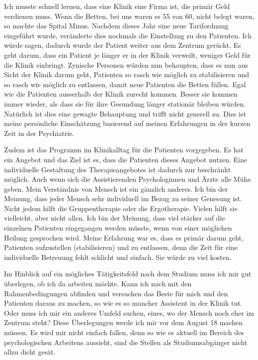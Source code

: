 Ich musste schnell lernen, dass eine Klinik eine Firma ist, die primär Geld verdienen muss. Wenn die Betten, bei uns waren es 55 von 60, nicht belegt waren, so machte das Spital Minus. Nachdem dieses Jahr eine neue Tarifordnung eingeführt wurde, veränderte dies nochmals die Einstellung zu den Patienten. Ich würde sagen, dadurch wurde der Patient weiter aus dem Zentrum gerückt. Es geht darum, dass ein Patient je länger er in der Klinik verweilt, weniger Geld für die Klinik einbringt. Zynische Personen würden nun behaupten, dass es nun aus Sicht der Klinik darum geht, Patienten so rasch wie möglich zu stabilisieren und so rasch wie möglich zu entlassen, damit neue Patienten die Betten füllen. Egal wie die Patienten ausserhalb der Klinik zurecht kommen. Besser sie kommen immer wieder, als dass sie für ihre Gesundung länger stationär bleiben würden. Natürlich ist dies eine gewagte Behauptung und trifft nicht generell zu. Dies ist meine persönliche Einschätzung basierend auf meinen Erfahrungen in der kurzen Zeit in der Psychiatrie. 

Zudem ist das Programm im Klinikalltag für die Patienten vorgegeben. Es hat ein Angebot und das Ziel ist es, dass die Patienten dieses Angebot nutzen. Eine individuelle Gestaltung des Therapieangebotes ist dadurch nur beschränkt möglich. Auch wenn sich die Assistierenden Psychologinnen und Ärzte alle Mühe geben. Mein Verständnis von Mensch ist ein gänzlich anderes. Ich bin der Meinung, dass jeder Mensch sehr individuell im Bezug zu seiner Genesung ist. Nicht jedem hilft die Gruppentherapie oder die Ergotherapie. Vielen hilft sie vielleicht, aber nicht allen. Ich bin der Meinung, dass viel stärker auf die einzelnen Patienten eingegangen werden müsste, wenn von einer möglichen Heilung gesprochen wird. Meine Erfahrung war es, dass es primär darum geht, Patienten aufzustellen (stabilisieren) und zu entlassen, denn die Zeit für eine individuelle Betreuung fehlt schlicht und einfach. Sie würde zu viel kosten. 

Im Hinblick auf ein mögliches Tätigkeitsfeld nach dem Studium muss ich mir gut überlegen, ob ich da arbeiten möchte. Kann ich mich mit den Rahmenbedingungen abfinden und versuchen das Beste für mich und den Patienten daraus zu machen, so wie es so mancher Assistent in der Klinik tut. Oder muss ich mir ein anderes Umfeld suchen, eines, wo der Mensch noch eher im Zentrum steht? Diese Überlegungen werde ich mir vor dem August 18 machen müssen. Es wird mir nicht einfach fallen, denn so wie es aktuell im Bereich des psychologischen Arbeitens aussieht, sind die Stellen als Studiumsabgänger nicht allzu dicht gesät.
    
